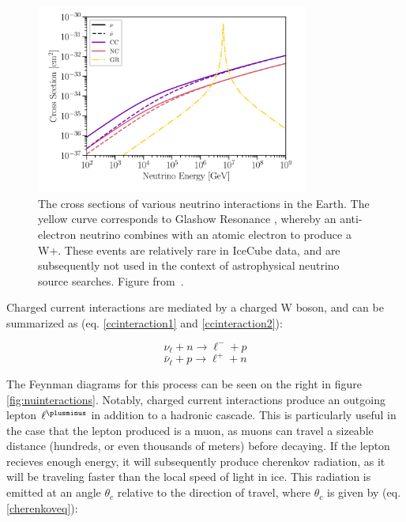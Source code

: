 \begin{figure}[h]
\centering
\includegraphics[width=0.8\textwidth]{figs/nu_cross_sections.png}
\caption{The cross sections of various neutrino interactions in the Earth. The yellow curve corresponds to Glashow Resonance \cite{IceCubeGlashow}, whereby an anti-electron neutrino combines with an atomic electron to produce a W+. These events are relatively rare in IceCube data, and are subsequently not used in the context of astrophysical neutrino source searches. Figure from~\cite{AustinThesis}.}
\label{fig:cross_sections}
\end{figure}

Charged current interactions are mediated by a charged W boson, and can be summarized as (eq. \ref{ccinteraction1} and \ref{ccinteraction2}):

\begin{equation}
    \nu_\ell +  n \rightarrow \ell^- + p
\label{ccinteraction1}
\end{equation}
\begin{equation}
    \bar{\nu}_\ell +  p \rightarrow \ell^+ + n
\label{ccinteraction2}
\end{equation}

The Feynman diagrams for this process can be seen on the right in figure \ref{fig:nuinteractions}. Notably, charged current interactions produce an outgoing lepton $\ell^\plusminus$ in addition to a hadronic cascade. This is particularly useful in the case that the lepton produced is a muon, as muons can travel a sizeable distance (hundreds, or even thousands of meters) before decaying. If the lepton recieves enough energy, it will subsequently produce cherenkov radiation, as it will be traveling faster than the local speed of light in ice. This radiation is emitted at an angle $\theta_c$ relative to the direction of travel, where $\theta_c$ is given by (eq. \ref{cherenkoveq}):

